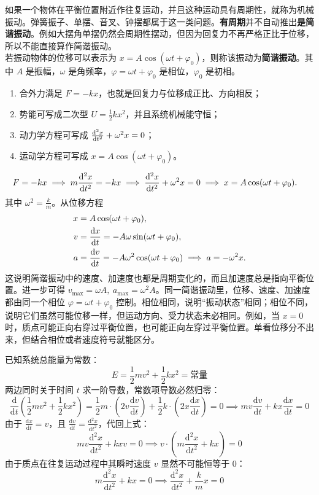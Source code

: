 \documentclass[lang=cn,11pt]{elegantbook}
\begin{document}
\begin{definition}
如果一个物体在平衡位置附近作往复运动，并且这种运动具有周期性，就称为机械振动。弹簧振子、单摆、音叉、钟摆都属于这一类问题。\textbf{有周期}并不自动推出\textbf{是简谐振动}。例如大摆角单摆仍然会周期性摆动，但因为回复力不再严格正比于位移，所以不能直接算作简谐振动。\\若振动物体的位移可以表示为 \(x=A\cos(\omega t+\varphi_0)\)，则称该振动为\textbf{简谐振动}。其中 \(A\) 是振幅，\(\omega\) 是角频率，\(\varphi=\omega t+\varphi_0\) 是相位，\(\varphi_0\) 是初相。
\begin{enumerate}
 \item 合外力满足 \(F=-kx\)，也就是回复力与位移成正比、方向相反；
 \item 势能可写成二次型 \(U=\frac{1}{2}kx^2\)，并且系统机械能守恒；
 \item 动力学方程可写成 \(\dv[2]{x}{t}+\omega^2x=0\)；
 \item 运动学方程可写成 \(x=A\cos(\omega t+\varphi_0)\)。
\end{enumerate}
\begin{align*}
F=-kx &\implies m\dv[2]{x}{t}=-kx\implies \dv[2]{x}{t}+\omega^2x=0\implies x=A\cos(\omega t+\varphi_0).
\end{align*}
其中 \(\omega^2=\frac{k}{m}\)。从位移方程
\[
\begin{aligned}
x&=A\cos(\omega t+\varphi_0),\\
v&=\dv{x}{t}=-A\omega\sin(\omega t+\varphi_0),\\
a&=\dv{v}{t}=-A\omega^2\cos(\omega t+\varphi_0)
\implies a=-\omega^2x.
\end{aligned}
\]
这说明简谐振动中的速度、加速度也都是周期变化的，而且加速度总是指向平衡位置。进一步可得 \(v_{\max}=\omega A,\ a_{\max}=\omega^2A\)。同一简谐振动里，位移、速度、加速度都由同一个相位 \(\varphi=\omega t+\varphi_0\) 控制。相位相同，说明“振动状态”相同；相位不同，说明它们虽然可能位移一样，但运动方向、受力状态未必相同。例如，当 \(x=0\) 时，质点可能正向右穿过平衡位置，也可能正向左穿过平衡位置。单看位移分不出来，但结合相位或者速度符号就能区分。
\end{definition}
\begin{note}
已知系统总能量为常数：$$E = \frac{1}{2}m v^2 + \frac{1}{2}k x^2 = \text{常量}$$两边同时关于时间 $t$ 求一阶导数，常数项导数必然归零：$$\frac{\mathrm{d}}{\mathrm{d}t} \left( \frac{1}{2}m v^2 + \frac{1}{2}k x^2 \right) =\frac{1}{2}m \cdot \left( 2v \frac{\mathrm{d}v}{\mathrm{d}t} \right) + \frac{1}{2}k \cdot \left( 2x \frac{\mathrm{d}x}{\mathrm{d}t} \right) = 0 \implies m v \frac{\mathrm{d}v}{\mathrm{d}t} + k x \frac{\mathrm{d}x}{\mathrm{d}t} = 0$$
由于 $\frac{\mathrm{d}x}{\mathrm{d}t} = v$，且 $\frac{\mathrm{d}v}{\mathrm{d}t} = \frac{\mathrm{d}^2x}{\mathrm{d}t^2}$，代回上式：$$m v \frac{\mathrm{d}^2x}{\mathrm{d}t^2} + k x v = 0 \implies v \cdot \left( m \frac{\mathrm{d}^2x}{\mathrm{d}t^2} + k x \right) = 0$$由于质点在往复运动过程中其瞬时速度 $v$ 显然不可能恒等于 0：$$m \frac{\mathrm{d}^2x}{\mathrm{d}t^2} + k x = 0 \implies \boxed{\frac{\mathrm{d}^2x}{\mathrm{d}t^2} + \frac{k}{m}x = 0}$$
\end{note}
\end{document}
